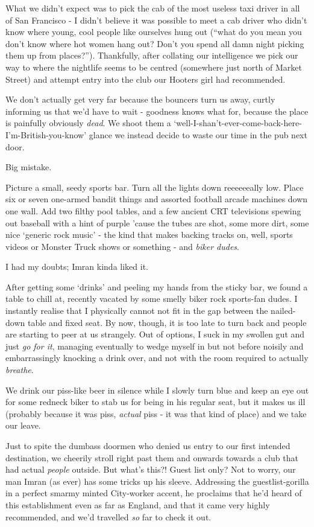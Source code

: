 \documentclass[a5paper,titlepage,11pt,draft]{book}
\begin{document}
What we didn't expect was to pick the cab of the most useless taxi driver in all of San Francisco - I didn't believe it was possible to meet a cab driver who didn't know where young, cool people like ourselves hung out (``what do you mean you don't know where hot women hang out?  Don't you spend all damn night picking them up from places?'').  Thankfully, after collating our intelligence we pick our way to where the nightlife seems to be centred (somewhere just north of Market Street) and attempt entry into the club our Hooters girl had recommended.

We don't actually get very far because the bouncers turn us away, curtly informing us that we'd have to wait - goodness knows what for, because the place is painfully obviously \emph{dead}.  We shoot them a `well-I-shan't-ever-come-back-here-I'm-British-you-know' glance we instead decide to waste our time in the pub next door.

Big mistake.

Picture a small, seedy sports bar.  Turn all the lights down reeeeeeally low.  Place six or seven one-armed bandit things and assorted football arcade machines down one wall.  Add two filthy pool tables, and a few ancient CRT televisions spewing out baseball with a hint of purple 'cause the tubes are shot, some more dirt, some nice `generic rock music' - the kind that makes backing tracks on, well, sports videos or Monster Truck shows or something - and \emph{biker dudes}.

I had my doubts; Imran kinda liked it.

After getting some `drinks' and peeling my hands from the sticky bar, we found a table to chill at, recently vacated by some smelly biker rock sports-fan dudes.  I instantly realise that I physically cannot not fit in the gap between the nailed-down table and fixed seat.  By now, though, it is too late to turn back and people are starting to peer at us strangely.  Out of options, I suck in my swollen gut and just \emph{go for it}, managing eventually to wedge myself in but not before noisily and embarrassingly knocking a drink over, and not with the room required to actually \emph{breathe}.

We drink our piss-like beer in silence while I slowly turn blue and keep an eye out for some redneck biker to stab us for being in his regular seat, but it makes us ill (probably because it was piss, \emph{actual} piss - it was that kind of place) and we take our leave.

Just to spite the dumbass doormen who denied us entry to our first intended destination, we cheerily stroll right past them and onwards towards a club that had actual \emph{people} outside.  But what's this?!  Guest list only?  Not to worry, our man Imran (as ever) has some tricks up his sleeve.  Addressing the guestlist-gorilla in a perfect smarmy minted City-worker accent, he proclaims that he'd heard of this establishment even as far as England, and that it came very highly recommended, and we'd travelled \emph{so} far to check it out.
\end{document}
